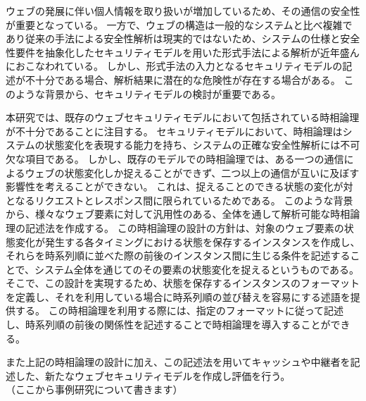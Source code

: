 \documentclass[12pt,a4paper]{jbook}
\begin{document}
\color{red}
ウェブの発展に伴い個人情報を取り扱いが増加しているため、その通信の安全性が重要となっている。
一方で、ウェブの構造は一般的なシステムと比べ複雑であり従来の手法による安全性解析は現実的ではないため、システムの仕様と安全性要件を抽象化したセキュリティモデルを用いた形式手法による解析が近年盛んにおこなわれている。
しかし、形式手法の入力となるセキュリティモデルの記述が不十分である場合、解析結果に潜在的な危険性が存在する場合がある。
このような背景から、セキュリティモデルの検討が重要である。

本研究では、既存のウェブセキュリティモデルにおいて包括されている時相論理が不十分であることに注目する。
セキュリティモデルにおいて、時相論理はシステムの状態変化を表現する能力を持ち、システムの正確な安全性解析には不可欠な項目である。
しかし、既存のモデルでの時相論理では、ある一つの通信によるウェブの状態変化しか捉えることができず、二つ以上の通信が互いに及ぼす影響性を考えることができない。
これは、捉えることのできる状態の変化が対となるリクエストとレスポンス間に限られているためである。
このような背景から、様々なウェブ要素に対して汎用性のある、全体を通して解析可能な時相論理の記述法を作成する。
この時相論理の設計の方針は、対象のウェブ要素の状態変化が発生する各タイミングにおける状態を保存するインスタンスを作成し、それらを時系列順に並べた際の前後のインスタンス間に生じる条件を記述することで、システム全体を通じてのその要素の状態変化を捉えるというものである。
そこで、この設計を実現するため、状態を保存するインスタンスのフォーマットを定義し、それを利用している場合に時系列順の並び替えを容易にする述語を提供する。
この時相論理を利用する際には、指定のフォーマットに従って記述し、時系列順の前後の関係性を記述することで時相論理を導入することができる。

また上記の時相論理の設計に加え、この記述法を用いてキャッシュや中継者を記述した、新たなウェブセキュリティモデルを作成し評価を行う。
\\（ここから事例研究について書きます）


\color{black}
\end{document}
